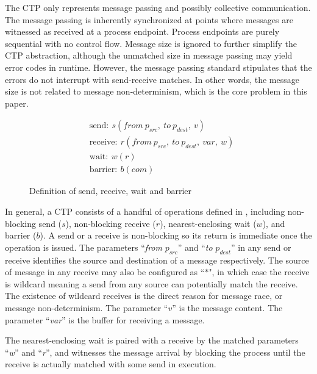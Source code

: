The CTP only represents message passing and possibly collective communication. 
The message passing is inherently synchronized at points where messages are witnessed as received at a process endpoint. 
Process endpoints are purely sequential with no control flow. 
Message size is ignored to further simplify the CTP abstraction, although the unmatched size in message passing may yield error codes in runtime. However, the message passing standard stipulates that the errors do not interrupt with send-receive matches. In other words, the message size is not related to message non-determinism, which is the core problem in this paper.


\begin{figure}[h]
\begin{equation*} 
\begin{split}
&\mathrm{send:}\ s(\mathit{from}\ p_{src},\ \mathit{to}\ p_{dest},\ v)\\
&\mathrm{receive:}\ r(\mathit{from}\ p_{src},\ \mathit{to}\ p_{dest},\ \mathit{var},\ w)\\ 
&\mathrm{wait: }\ w(r)\\
&\mathrm{barrier: }\ b(\mathit{com})
\end{split}
\end{equation*}
\caption{Definition of send, receive, wait and barrier}
\label{fig:operation}
\end{figure}

\examplefigone

In general, a CTP consists of a handful of operations defined in , including non-blocking send ($s$), non-blocking receive ($r$), nearest-enclosing wait ($w$), and barrier ($b$). 
A send or a receive is non-blocking so its return is immediate once the operation is issued.
The parameters ``\textit{from} $p_{src}$'' and ``\textit{to} $p_{dest}$'' in any send or receive identifies the source and destination of a message respectively. The source of message in any receive may also be configured as ``$\ast$", in which case the receive is wildcard meaning a send from any source can potentially match the receive. 
The existence of wildcard receives is the direct reason for message race, or message non-determinism. 
The parameter ``$v$'' is the message content. The parameter ``\textit{var}'' is the buffer for receiving a message.

The nearest-enclosing wait is paired with a receive by the matched parameters ``\textit{w}'' and ``\textit{r}'', and witnesses the message arrival by blocking the process until the receive is actually matched with some send in execution.

